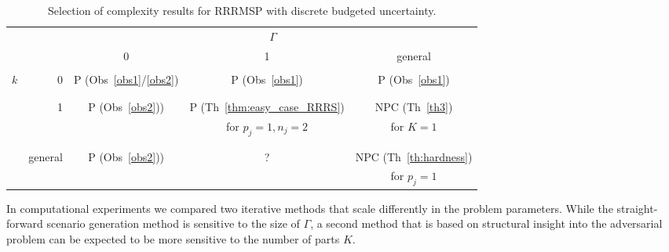 \documentclass[a4paper,11pt,abstracton]{scrartcl}
\theoremstyle{definition}
\theoremstyle{remark}
\begin{document}
\begin{table}[htb]
\begin{center}
\begin{tabular}{rr|c|c|c}
 & & \multicolumn{3}{c}{$\Gamma$} \\
 & & 0 & 1 & general \\
 \hline
 & & & & \\[-1.5ex]
\multirow{8}{*}{$k$} & \multirow{2}{*}{0} & \multirow{2}{*}{P (Obs~\ref{obs1}/\ref{obs2})} & \multirow{2}{*}{P (Obs~\ref{obs1})} & \multirow{2}{*}{P (Obs~\ref{obs1})}\\
& & & & \\[-1.5ex]
 & & & & \phantom{for $p_j=1,n_j=2$} \\
\cline{3-5} & & & & \\[-1.5ex]
 & \multirow{2}{*}{1} & \multirow{2}{*}{P (Obs~\ref{obs2}))} & P  (Th~\ref{thm:easy_case_RRRS}) & NPC (Th~\ref{th3}) \\
 &   &   \phantom{for $p_j=1,n_j=2$}     & for $p_j=1,n_j=2$ & for $K=1$  \\
 & & & & \\[-1.5ex]
\cline{3-5} & & & & \\[-1.5ex]
 & \multirow{2}{*}{general} & \multirow{2}{*}{P (Obs~\ref{obs2}))} & \multirow{2}{*}{?} & NPC  (Th~\ref{th:hardness}) \\
 &         &         &   & for $p_j=1$
\end{tabular}
\end{center}
\caption{Selection of complexity results for RRRMSP with discrete budgeted uncertainty.\label{tab:summary}}
\end{table}


In computational experiments we compared two iterative methods that scale differently in the problem parameters. While the straight-forward scenario generation method is sensitive to the size of $\Gamma$, a second method that is based on structural insight into the adversarial problem can be expected to be more sensitive to the number of parts $K$.
\end{document}
